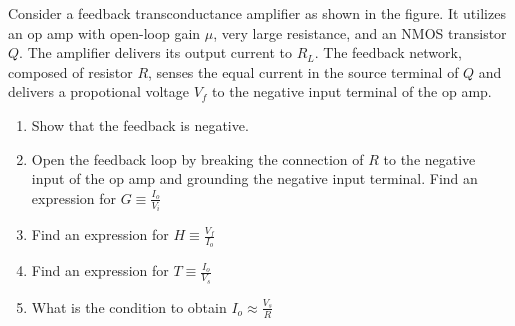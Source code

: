 Consider a feedback transconductance amplifier as shown in the figure. It utilizes an op amp with open-loop gain $\mu$, very large resistance, and an NMOS transistor $Q$. The amplifier delivers its output current to $R_L$. The feedback network, composed of resistor $R$, senses the equal current in the source terminal of $Q$ and delivers a propotional voltage $V_f$  to the negative input terminal of the op amp.

\begin{figure}[ht!]
	\begin{center}
	    \resizebox{\columnwidth/1}{!}{}
	\end{center}
	\caption{}
	\label{fig:es17btech11015_fige}
\end{figure}

\begin{enumerate}[label=\arabic*.,ref=\theenumi]
\item Show that the feedback is negative.
\item Open the feedback loop by breaking the connection of $R$ to the negative input of the op amp and grounding the negative input terminal. Find an expression for $G \equiv \frac{I_o}{V_i}$
\item Find an expression for $H \equiv \frac{V_f}{I_o}$
\item Find an expression for $T \equiv \frac{I_o}{V_s}$
\item What is the condition to obtain $I_o\approx\frac{V_s}{R}$
\end{enumerate}\newpage

